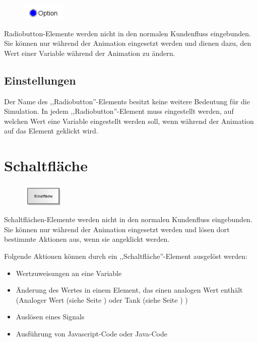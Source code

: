 \begin{figure}
\vspace{-22pt}
\includegraphics[width=2cm]{imageModelElementInteractiveRadiobutton.png}
\vspace{-22pt}
\end{figure}

Radiobutton-Elemente werden nicht in den normalen Kundenfluss eingebunden.
Sie können nur während der Animation eingesetzt werden und dienen dazu,
den Wert einer Variable während der Animation zu ändern.

\subsection*{Einstellungen}

Der Name des ,,Radiobutton''-Elements besitzt keine weitere Bedeutung für die Simulation.
In jedem ,,Radiobutton''-Element muss eingestellt werden, auf welchen Wert eine Variable
eingestellt werden soll, wenn während der Animation auf das Element geklickt wird.


\section{Schaltfläche}
\label{ref:ModelElementInteractiveButton}

\begin{figure}
\vspace{-22pt}
\includegraphics[width=2cm]{imageModelElementInteractiveButton.png}
\vspace{-22pt}
\end{figure}

Schaltflächen-Elemente werden nicht in den normalen Kundenfluss eingebunden.
Sie können nur während der Animation eingesetzt werden und lösen dort bestimmte
Aktionen aus, wenn sie angeklickt werden.

Folgende Aktionen können durch ein ,,Schaltfläche''-Element ausgelöst werden:

\begin{itemize}
  \item Wertzuweisungen an eine Variable 
  \item Änderung des Wertes in einem Element, das einen analogen Wert enthält
  (Analoger Wert (siehe Seite \pageref{ref:ModelElementAnalogValue}) oder Tank (siehe Seite \pageref{ref:ModelElementTank}) )
  \item Auslösen eines Signals 
  \item Ausführung von Javascript-Code oder Java-Code 
\end{itemize}

